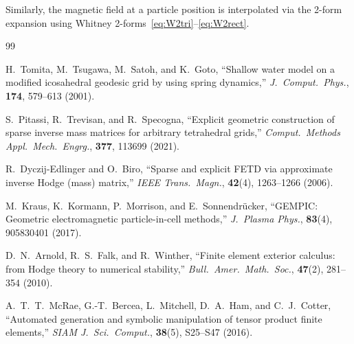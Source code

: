 \documentclass[11pt,a4paper]{article}
\begin{document}
Similarly, the magnetic field at a particle position is interpolated via the
2-form expansion using Whitney 2-forms~\eqref{eq:W2tri}--\eqref{eq:W2rect}.

\begin{thebibliography}{99}

  H.~Tomita, M.~Tsugawa, M.~Satoh, and K.~Goto,
  ``Shallow water model on a modified icosahedral geodesic grid by using
  spring dynamics,''
  \emph{J.\ Comput.\ Phys.}, \textbf{174}, 579--613 (2001).

  S.~Pitassi, R.~Trevisan, and R.~Specogna,
  ``Explicit geometric construction of sparse inverse mass matrices for
  arbitrary tetrahedral grids,''
  \emph{Comput.\ Methods Appl.\ Mech.\ Engrg.}, \textbf{377}, 113699 (2021).

  R.~Dyczij-Edlinger and O.~Biro,
  ``Sparse and explicit FETD via approximate inverse Hodge (mass) matrix,''
  \emph{IEEE Trans.\ Magn.}, \textbf{42}(4), 1263--1266 (2006).

  M.~Kraus, K.~Kormann, P.~Morrison, and E.~Sonnendr\"ucker,
  ``GEMPIC: Geometric electromagnetic particle-in-cell methods,''
  \emph{J.\ Plasma Phys.}, \textbf{83}(4), 905830401 (2017).

  D.~N.~Arnold, R.~S.~Falk, and R.~Winther,
  ``Finite element exterior calculus: from Hodge theory to numerical
  stability,''
  \emph{Bull.\ Amer.\ Math.\ Soc.}, \textbf{47}(2), 281--354 (2010).

  A.~T.~T.~McRae, G.-T.~Bercea, L.~Mitchell, D.~A.~Ham, and C.~J.~Cotter,
  ``Automated generation and symbolic manipulation of tensor product finite
  elements,''
  \emph{SIAM J.\ Sci.\ Comput.}, \textbf{38}(5), S25--S47 (2016).

\end{thebibliography}
\end{document}
